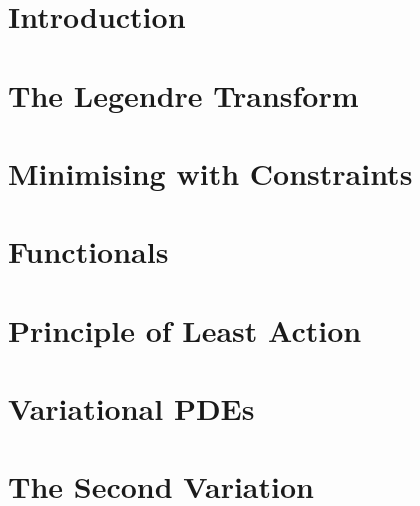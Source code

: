 \documentclass[british,11pt,a4paper]{report}
\begin{document}
\maketitle
\tableofcontents
\chapter{Introduction}

\chapter{The Legendre Transform}

\chapter{Minimising with Constraints}

\chapter{Functionals}

\chapter{Principle of Least Action}

\chapter{Variational PDEs}

\chapter{The Second Variation}
%
\end{document}
